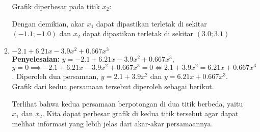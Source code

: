 \documentclass{article}
\newcommand{\penyelesaian}{\textbf{Penyelesaian: }}
\begin{document}
\begin{enumerate}
\begin{enumerate}
        Grafik diperbesar pada titik $x_2$:
        \begin{center}
        \end{center}
        Dengan demikian, akar $x_1$ dapat dipastikan terletak di sekitar $(\num{-1,1}; \num{-1,0})$ dan $x_2$ dapat dipastikan terletak di sekitar $(\num{3,0}; \num{3,1})$

        \item $\num{-2,1} + \num{6,21}x - \num{3,9}x^2 + \num{0,667}x^3$ \\
        \penyelesaian $y = \num{-2,1} + \num{6,21}x - \num{3,9}x^2 + \num{0,667}x^3$, \\
        $y = 0 \implies \num{-2,1} + \num{6,21}x - \num{3,9}x^2 + \num{0,667}x^3 = 0 \Leftrightarrow \num{2,1} + \num{3,9}x^2 = \num{6,21}x + \num{0,667}x^3$.
        Diperoleh dua persamaan, $y = \num{2,1} + \num{3,9}x^2$ dan $y = \num{6,21}x + \num{0,667}x^3$. \\

        Grafik dari kedua persamaan tersebut diperoleh sebagai berikut.
        \begin{center}
        \end{center}
        Terlihat bahwa kedua persamaan berpotongan di dua titik berbeda, yaitu $x_1$ dan $x_2$. 
        Kita dapat perbesar grafik di kedua titik tersebut agar dapat melihat informasi yang lebih jelas dari akar-akar persamaannya.\\


\end{enumerate}
\end{enumerate}
\end{document}

